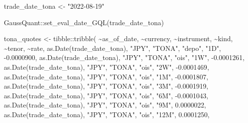\documentclass[
  letterpaper,
  DIV=11,
  numbers=noendperiod]{scrreprt}
\newenvironment{Shaded}{\begin{snugshade}}{\end{snugshade}}
\newcommand{\FloatTok}[1]{\textcolor[rgb]{0.68,0.00,0.00}{#1}}
\newcommand{\FunctionTok}[1]{\textcolor[rgb]{0.28,0.35,0.67}{#1}}
\newcommand{\NormalTok}[1]{\textcolor[rgb]{0.00,0.23,0.31}{#1}}
\newcommand{\OtherTok}[1]{\textcolor[rgb]{0.00,0.23,0.31}{#1}}
\newcommand{\SpecialCharTok}[1]{\textcolor[rgb]{0.37,0.37,0.37}{#1}}
\newcommand{\StringTok}[1]{\textcolor[rgb]{0.13,0.47,0.30}{#1}}
\begin{document}
\begin{Shaded}
\begin{Highlighting}[]
\NormalTok{trade\_date\_tona }\OtherTok{\textless{}{-}} \StringTok{"2022{-}08{-}19"}

\NormalTok{GaussQuant}\SpecialCharTok{::}\FunctionTok{set\_eval\_date\_GQL}\NormalTok{(trade\_date\_tona)}

\NormalTok{tona\_quotes }\OtherTok{\textless{}{-}}\NormalTok{ tibble}\SpecialCharTok{::}\FunctionTok{tribble}\NormalTok{(}
  \SpecialCharTok{\textasciitilde{}}\NormalTok{as\_of\_date, }\SpecialCharTok{\textasciitilde{}}\NormalTok{currency, }\SpecialCharTok{\textasciitilde{}}\NormalTok{instrument, }\SpecialCharTok{\textasciitilde{}}\NormalTok{kind, }\SpecialCharTok{\textasciitilde{}}\NormalTok{tenor, }\SpecialCharTok{\textasciitilde{}}\NormalTok{rate,}
  \FunctionTok{as.Date}\NormalTok{(trade\_date\_tona), }\StringTok{"JPY"}\NormalTok{, }\StringTok{"TONA"}\NormalTok{, }\StringTok{"depo"}\NormalTok{, }\StringTok{"1D"}\NormalTok{,  }\SpecialCharTok{{-}}\FloatTok{0.0000900}\NormalTok{,}
  \FunctionTok{as.Date}\NormalTok{(trade\_date\_tona), }\StringTok{"JPY"}\NormalTok{, }\StringTok{"TONA"}\NormalTok{, }\StringTok{"ois"}\NormalTok{,  }\StringTok{"1W"}\NormalTok{,  }\SpecialCharTok{{-}}\FloatTok{0.0001261}\NormalTok{,}
  \FunctionTok{as.Date}\NormalTok{(trade\_date\_tona), }\StringTok{"JPY"}\NormalTok{, }\StringTok{"TONA"}\NormalTok{, }\StringTok{"ois"}\NormalTok{,  }\StringTok{"2W"}\NormalTok{,  }\SpecialCharTok{{-}}\FloatTok{0.0001469}\NormalTok{,}
  \FunctionTok{as.Date}\NormalTok{(trade\_date\_tona), }\StringTok{"JPY"}\NormalTok{, }\StringTok{"TONA"}\NormalTok{, }\StringTok{"ois"}\NormalTok{,  }\StringTok{"1M"}\NormalTok{,  }\SpecialCharTok{{-}}\FloatTok{0.0001807}\NormalTok{,}
  \FunctionTok{as.Date}\NormalTok{(trade\_date\_tona), }\StringTok{"JPY"}\NormalTok{, }\StringTok{"TONA"}\NormalTok{, }\StringTok{"ois"}\NormalTok{,  }\StringTok{"3M"}\NormalTok{,  }\SpecialCharTok{{-}}\FloatTok{0.0001919}\NormalTok{,}
  \FunctionTok{as.Date}\NormalTok{(trade\_date\_tona), }\StringTok{"JPY"}\NormalTok{, }\StringTok{"TONA"}\NormalTok{, }\StringTok{"ois"}\NormalTok{,  }\StringTok{"6M"}\NormalTok{,  }\SpecialCharTok{{-}}\FloatTok{0.0001043}\NormalTok{,}
  \FunctionTok{as.Date}\NormalTok{(trade\_date\_tona), }\StringTok{"JPY"}\NormalTok{, }\StringTok{"TONA"}\NormalTok{, }\StringTok{"ois"}\NormalTok{,  }\StringTok{"9M"}\NormalTok{,   }\FloatTok{0.0000022}\NormalTok{,}
  \FunctionTok{as.Date}\NormalTok{(trade\_date\_tona), }\StringTok{"JPY"}\NormalTok{, }\StringTok{"TONA"}\NormalTok{, }\StringTok{"ois"}\NormalTok{,  }\StringTok{"12M"}\NormalTok{,  }\FloatTok{0.0001250}\NormalTok{,}

\end{Highlighting}
\end{Shaded}
\end{document}
